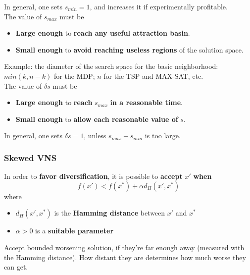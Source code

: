 In general, one sets $s_{min} = 1$, and increases it if experimentally profitable.\\

The value of $s_{max}$ must be
\begin{itemize}
	\item \textbf{Large enough} to \textbf{reach any useful attraction basin}.\\
	
	\item \textbf{Small enough} to \textbf{avoid reaching useless regions} of the solution space.\\
\end{itemize}
Example: the diameter of the search space for the basic neighborhood: $min (k, n - k)$ for the MDP; $n$ for the TSP and MAX-SAT, etc.\\

The value of $\delta s$ must be
\begin{itemize}
	\item \textbf{Large enough} to \textbf{reach} $s_{max}$ \textbf{in a reasonable time}.\\
	
	\item \textbf{Small enough} to \textbf{allow each reasonable value of} $s$.\\
\end{itemize}

In general, one sets $\delta s = 1$, unless $s_{max} - s_{min}$ is too large.\\

\newpage

\subsubsection{Skewed VNS}
In order to \textbf{favor diversification}, it is possible to \textbf{accept} $x'$ \textbf{when}
$$ f (x') < f (x^\ast) + \alpha d_H (x', x^\ast) $$
where
\begin{itemize}
	\item $d_H (x', x^\ast)$ is the \textbf{Hamming distance} between $x'$ and $x^\ast$
	
	\item $\alpha > 0$ is a \textbf{suitable parameter}
\end{itemize}
Accept bounded worsening solution, if they're far enough away (measured with the Hamming distance). How distant they are determines how much worse they can get.\\

